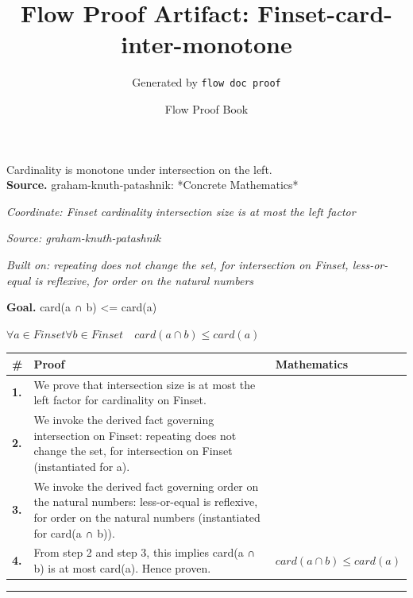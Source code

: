 \documentclass[11pt]{article}
\title{Flow Proof Artifact: Finset-card-inter-monotone}
\author{Generated by \texttt{flow doc proof}}
\date{Flow Proof Book}
\theoremstyle{definition}
\begin{document}
\maketitle
Cardinality is monotone under intersection on the left.\\[0.5em]
\textbf{Source.} graham-knuth-patashnik: *Concrete Mathematics*\\[0.5em]
\bigskip
{}\par
\smallskip\noindent\textit{Coordinate: Finset \cdot cardinality \cdot intersection size is at most the left factor}\par
\smallskip\noindent\textit{Source: graham-knuth-patashnik}\par
\smallskip\noindent\textit{Built on: repeating does not change the set, for intersection on Finset, less-or-equal is reflexive, for order on the natural numbers}\par
\medskip
\noindent\textbf{Goal.} card(a ∩ b) <= card(a)\par
\noindent$\displaystyle \forall a \in Finset \forall b \in Finset\quad card(a ∩ b) \le card(a)$\par
\medskip
\noindent
\begin{tabular}{@{} >{\raggedright\arraybackslash}p{} >{\raggedright\arraybackslash}p{} >{\raggedleft\arraybackslash}p{} @{}}
\textbf{\#} & \textbf{Proof} & \textbf{Mathematics} \\
\midrule
\textbf{1.} & We prove that intersection size is at most the left factor for cardinality on Finset. & \\[0.45em]
\textbf{2.} & We invoke the derived fact governing intersection on Finset: repeating does not change the set, for intersection on Finset (instantiated for a). & \\[0.45em]
\textbf{3.} & We invoke the derived fact governing order on the natural numbers: less-or-equal is reflexive, for order on the natural numbers (instantiated for card(a ∩ b)). & \\[0.45em]
\textbf{4.} & From step 2 and step 3, this implies card(a ∩ b) is at most card(a). Hence proven. & $\displaystyle card(a ∩ b) \le card(a)$ \\[0.45em]
\bottomrule
\end{tabular}
\label{thm:Finset-cardinality-intersection_size_is_at_most_the_left_factor}
\par\medskip\hrule
\end{document}
